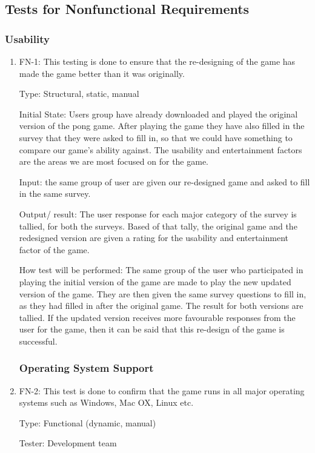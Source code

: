 \documentclass[12pt,letterpaper]{article}
\begin{document}
	\subsection{Tests for Nonfunctional Requirements}
	\subsubsection{Usability}
	\begin{enumerate}
	\item FN-1: This testing is done to ensure that the re-designing of the game has made the game better than it was originally.

	Type: Structural, static, manual

	Initial State: Users group have already downloaded and played the original version of the pong game. After playing the game they have also filled in the survey that they were asked to fill in, so that we could have something to compare our game’s ability against. The usability and entertainment factors are the areas we are most focused on for the game.

	Input: the same group of user are given our re-designed game and asked to fill in the same survey.

	Output/ result: The user response for each major category of the survey is tallied, for both the surveys. Based of that tally, the original game and the redesigned version are given a rating for the usability and entertainment factor of the game. 

	How test will be performed: The same group of the user who participated in playing the initial version of the game are made to play the new updated version of the game. They are then given the same survey questions to fill in, as they had filled in after the original game. The result for both versions are tallied. If the updated version receives more favourable responses from the user for the game, then it can be said that this re-design of the game is successful.  
	

	\subsubsection{Operating System Support}
	\item FN-2: This test is done to confirm that the game runs in all major operating systems such as Windows, Mac OX, Linux etc. 

	Type: Functional (dynamic, manual)

	Tester: Development team
	

\end{enumerate}
\end{document}
